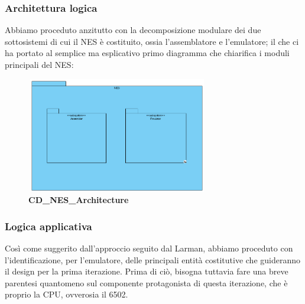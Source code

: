 \documentclass[11pt]{article}
\begin{document}
\subsubsection{Architettura logica}
Abbiamo proceduto anzitutto con la decomposizione modulare dei due sottosistemi di cui il NES è costituito, ossia l'assemblatore e l'emulatore; il che ci ha portato al semplice ma esplicativo primo diagramma che chiarifica i moduli principali del NES:
\begin{figure}[h]
\centering
\includegraphics[width=300px, height=191px]{CD_NES_Architecture.png}\\
\small\textbf{CD\_NES\_Architecture}
\end{figure}

\subsubsection{Logica applicativa}
Così come suggerito dall'approccio seguito dal Larman, abbiamo proceduto con l'identificazione, per l'emulatore, delle principali entità costitutive che guideranno il design per la prima iterazione. Prima di ciò, bisogna tuttavia fare una breve parentesi quantomeno sul componente protagonista di questa iterazione, che è proprio la CPU, ovverosia il 6502. 
\end{document}
